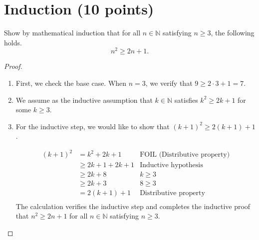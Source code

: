 \documentclass[11pt]{article}
\newcounter{pgpts}
\newcounter{cumpts}
\newcommand{\cnewpage}{\addtocounter{cumpts}{\value{pgpts}}\newpage\setcounter{pgpts}{0}}
\begin{document}








\cnewpage

\section{Induction (10 points)}\addtocounter{pgpts}{10}
Show by mathematical induction that for all $n\in \mathbb{N}$ satisfying $n\geq 3$, the following holds.
\[
n^2 \geq 2n+1.
\]

\begin{proof}
\begin{enumerate}
    \item First, we check the base case. When $n=3$, we verify that $9\geq 2\cdot3+1=7$.
    \item We assume as the inductive assumption that $k\in \mathbb{N}$ satisfies $k^2\geq 2k+1$ for some $k\geq 3$.
    \item For the inductive step, we would like to show that $(k+1)^2 \geq 2(k+1)+1$.

\begin{align*}
    (k+1)^2&=k^2+2k+1 &\text{FOIL (Distributive property)}\\
    &\geq 2k+1+2k+1 &\text{Inductive hypothesis}\\
    &\geq 2k+8 &\text{$k\geq3$}\\
    &\geq 2k+3 &\text{$8\geq 3$}\\
    &= 2(k+1)+1 &\text{Distributive property}\\
\end{align*}
The calculation verifies the inductive step and completes the inductive proof that $n^2\geq 2n+1$ for all $n\in \mathbb{N}$ satisfying $n\geq 3$.

\end{enumerate}


\end{proof}


\cnewpage
\end{document}
